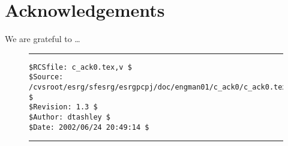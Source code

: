 \chapter{Acknowledgements}

We are grateful to \ldots{}


\noindent\begin{figure}[!b]
\noindent\rule[-0.25in]{\textwidth}{1pt}
\begin{tiny}
\begin{verbatim}
$RCSfile: c_ack0.tex,v $
$Source: /cvsroot/esrg/sfesrg/esrgpcpj/doc/engman01/c_ack0/c_ack0.tex,v $
$Revision: 1.3 $
$Author: dtashley $
$Date: 2002/06/24 20:49:14 $
\end{verbatim}
\end{tiny}
\noindent\rule[0.25in]{\textwidth}{1pt}
\end{figure}

%
%

